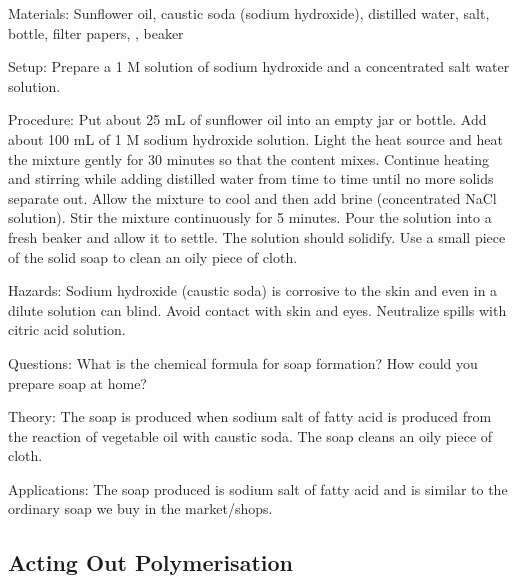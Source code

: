 \begin{multicols}{2}
\begin{description*}
\item[Materials:]{Sunflower oil, caustic soda (sodium hydroxide), distilled water, salt, bottle, filter papers, , beaker}
\item[Setup:]{Prepare a 1 M solution of sodium hydroxide and a concentrated salt water solution.}
\item[Procedure:]{Put about 25 mL of sunflower oil into an empty jar or bottle. Add about 100 mL of 1 M sodium hydroxide solution. Light the heat source and heat the mixture gently for 30 minutes so that the content mixes. Continue heating and stirring while adding distilled water from time to time until no more solids separate out. Allow the mixture to cool and then add brine (concentrated NaCl solution). Stir the mixture continuously for 5 minutes. Pour the solution into a fresh beaker and allow it to settle. The solution should solidify. Use a small piece of the solid soap to clean an oily piece of cloth.}
\item[Hazards:]{Sodium hydroxide (caustic soda) is corrosive to the skin and even in a dilute solution can blind. Avoid contact with skin and eyes. Neutralize spills with citric acid solution.}
\item[Questions:]{What is the chemical formula for soap formation? How could you prepare soap at home?}
\item[Theory:]{The soap is produced when sodium salt of fatty acid is produced from the reaction of vegetable oil with caustic soda. The soap cleans an oily piece of cloth.}
\item[Applications:]{The soap produced is sodium salt of fatty acid and is similar to the ordinary soap we buy in the market/shops.}
\end{description*}

\subsection{Acting Out Polymerisation}


\end{multicols}
